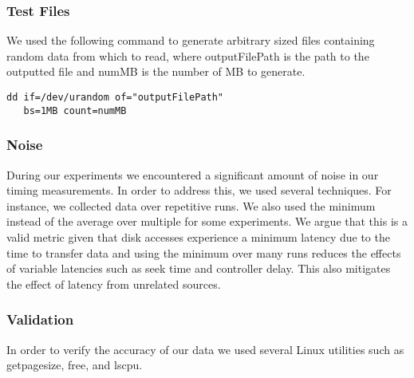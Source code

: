 \subsubsection{Test Files}
We used the following command to generate arbitrary sized files containing random
data from which to read, where outputFilePath is the path to the outputted file 
and numMB is the number of MB to generate.

\begin{verbatim}
dd if=/dev/urandom of="outputFilePath" 
   bs=1MB count=numMB
\end{verbatim}

\subsubsection{Noise}
During our experiments we encountered a significant amount of noise in our 
timing measurements. In order to address this, we used several techniques. For instance,
we collected data over repetitive runs. We also used the minimum instead of the average
over multiple for some experiments. We argue that this is a valid metric given 
that disk accesses experience a minimum latency due to the time to transfer data
and using the minimum over many runs reduces the effects of variable latencies 
such as seek time and controller delay. This also mitigates the effect of 
latency from unrelated sources.

\subsubsection{Validation}
In order to verify the accuracy of our data we used several Linux utilities such
as getpagesize, free, and lscpu. 

